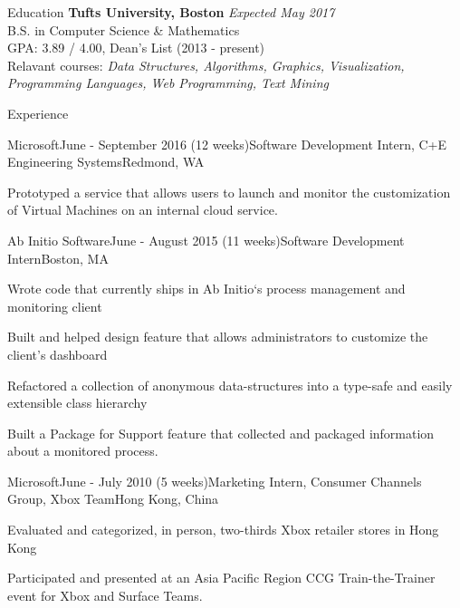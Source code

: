 \documentclass{resume}
\begin{document}
  \begin{rSection}{Education}
    {\bf Tufts University, Boston} \hfill {\em Expected May 2017} \\ 
    { B.S. in Computer Science \& Mathematics } \\
    GPA: 3.89 / 4.00, Dean's List (2013 - present)\\
    Relavant courses: 
    \textit{Data Structures, Algorithms, Graphics, Visualization, Programming Languages, Web Programming, Text Mining}
  \end{rSection}
  
  \begin{rSection}{Experience}
  
    \begin{rSubsection}{Microsoft}{June - September 2016 (12 weeks)}{Software Development Intern, C+E Engineering Systems}{Redmond, WA}
    \item Prototyped a service that allows users to launch and monitor the customization of Virtual Machines on an internal cloud service.
    \end{rSubsection}
  
    \begin{rSubsection}{Ab Initio Software}{June - August 2015 (11 weeks)}{Software Development Intern}{Boston, MA}
    \item Wrote code that currently ships in Ab Initio`s process management and monitoring client
    \item Built and helped design feature that allows administrators to customize the client’s dashboard
    \item Refactored a collection of anonymous data-structures into a type-safe and easily extensible class hierarchy
    \item Built a Package for Support feature that collected and packaged information about a monitored process.
    \end{rSubsection}

    \begin{rSubsection}{Microsoft}{June - July 2010 (5 weeks)}{Marketing Intern, Consumer Channels Group, Xbox Team}{Hong Kong, China}
    \item Evaluated and categorized, in person, two-thirds Xbox retailer stores in Hong Kong
    \item Participated and presented at an Asia Pacific Region CCG Train-the-Trainer event for Xbox and Surface Teams.
    \end{rSubsection}
  
  \end{rSection}
\end{document}
